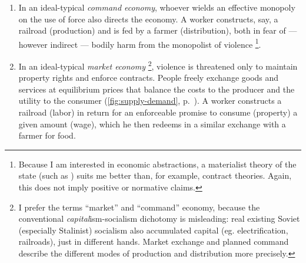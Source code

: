\begin{enumerate}
	\item 
		In an ideal-typical \cite{Weber-1920-aa} \emph{command economy}, whoever wields an effective monopoly on the use of force also directs the economy. 
		A worker constructs, say, a railroad (production) and is fed by a farmer (distribution), both in fear of --- however indirect --- bodily harm from the monopolist of violence
		\footnote{
			Because I am  interested in economic abstractions, a materialist theory of the state (such as \citealt{Tilly-1985-aa}) suits me better than, for example, contract theories. %
			Again, this does not imply positive or normative claims.
		}. 
	\item 
		In an ideal-typical \emph{market economy}
		\footnote{
			I prefer the terms ``market'' and ``command'' economy, because the conventional \emph{capital}ism-socialism dichotomy is misleading: real existing Soviet (especially Stalinist) socialism also accumulated capital (eg. electrification, railroads), just in different hands. 
			Market exchange and planned command describe the different modes of production and distribution more precisely.
		}, 
		violence is threatened only to maintain property rights and enforce contracts. 
			People freely exchange goods and services at equilibrium prices that balance the costs to the producer and the utility to the consumer (\autoref{fig:supply-demand}, p.~\pageref{fig:supply-demand}). 
			 A worker constructs a railroad (labor) in return for an enforceable promise to consume (property) a given amount (wage), which he then redeems in a similar exchange with a farmer for food. 
\end{enumerate}

